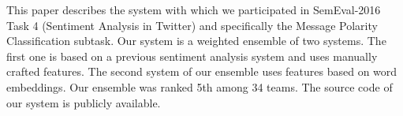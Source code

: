 This paper describes the system with which we participated in SemEval-2016 Task 4 (Sentiment Analysis in Twitter) and specifically the Message Polarity Classification subtask. Our system is a weighted ensemble of two systems. The first one is based on a previous sentiment analysis system and uses manually crafted features. The second system of our ensemble uses features based on word embeddings. Our ensemble was ranked 5th among 34 teams. The source code of our system is publicly available.
